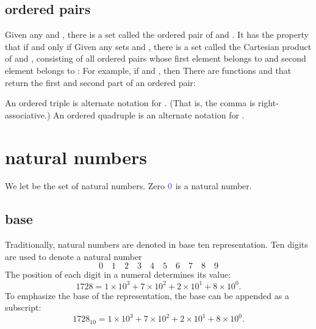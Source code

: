 \documentclass[cup9a]{cupbook}
\begin{document}
\subsection{ordered pairs}

Given any  and , there is a set  called the ordered pair
of  and .  It has the property that  if and only if
Given any sets  and , there is a set  called the Cartesian product of  and , consisting of all ordered pairs whose first element belongs to  and second element belongs to :
For example, if  and , then
There are functions  and  that return the first and second part of an ordered pair:

An ordered triple  is alternate notation for .  (That is, the comma is right-associative.)  An ordered quadruple  is an alternate notation for .  









\section{natural numbers}

We let  be the set of natural numbers. 
Zero $\mc{0}$ is a natural number.

\subsection{base}

Traditionally, natural numbers are denoted in base ten representation.  Ten digits are used to denote a natural number
$$
0\quad 1\quad 2\quad 3\quad 4\quad 5\quad 6\quad 7\quad 8\quad 9
$$
The position of each digit in a numeral determines its value:
$$
1728 = 1\times 10^3 + 7\times 10^2 + 2\times 10^1 + 8\times 10^0.
$$
To emphasize the base of the representation, the base can be appended as a subscript:
$$1728_{10}=1\times 10^3 + 7\times 10^2 + 2\times 10^1 + 8\times 10^0.$$
\end{document}
